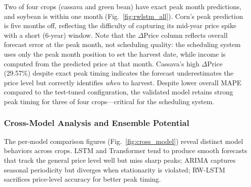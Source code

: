 \documentclass[journal]{IEEEtran}
\begin{document}
Two of four crops (cassava and green bean) have exact peak month predictions, and soybean is within one month (Fig.~\ref{fig:rwlstm_all}). Corn's peak prediction is five months off, reflecting the difficulty of capturing its mid-year price spike with a short (6-year) window. Note that the $\Delta$Price column reflects overall forecast error at the peak month, not scheduling quality: the scheduling system uses only the peak month position to set the harvest date, while income is computed from the predicted price at that month. Cassava's high $\Delta$Price (29.57\%) despite exact peak timing indicates the forecast underestimates the price level but correctly identifies \textit{when} to harvest. Despite lower overall MAPE compared to the test-tuned configuration, the validated model retains strong peak timing for three of four crops---critical for the scheduling system.

\subsubsection{Cross-Model Analysis and Ensemble Potential}

The per-model comparison figures (Fig.~\ref{fig:cross_model}) reveal distinct model behaviors across crops. LSTM and Transformer tend to produce smooth forecasts that track the general price level well but miss sharp peaks; ARIMA captures seasonal periodicity but diverges when stationarity is violated; RW-LSTM sacrifices price-level accuracy for better peak timing.
\end{document}
